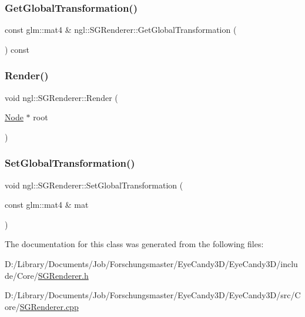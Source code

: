 \mbox{\label{classngl_1_1_s_g_renderer_a7ea21d48ea05c05c4e1cc2161bbaf5d4}} 
\subsubsection{\texorpdfstring{Get\+Global\+Transformation()}{GetGlobalTransformation()}}
{\footnotesize\ttfamily const glm\+::mat4 \& ngl\+::\+S\+G\+Renderer\+::\+Get\+Global\+Transformation (\begin{DoxyParamCaption}{ }\end{DoxyParamCaption}) const}

\mbox{\label{classngl_1_1_s_g_renderer_a608ef64bc93b33694b8650cb05a8a3b1}} 
\subsubsection{\texorpdfstring{Render()}{Render()}}
{\footnotesize\ttfamily void ngl\+::\+S\+G\+Renderer\+::\+Render (\begin{DoxyParamCaption}\item[{\mbox{\hyperlink{classngl_1_1_node}{Node}} $\ast$}]{root }\end{DoxyParamCaption})}

\mbox{\label{classngl_1_1_s_g_renderer_a611a1f8449c50468d4b06a22f2e484e6}} 
\subsubsection{\texorpdfstring{Set\+Global\+Transformation()}{SetGlobalTransformation()}}
{\footnotesize\ttfamily void ngl\+::\+S\+G\+Renderer\+::\+Set\+Global\+Transformation (\begin{DoxyParamCaption}\item[{const glm\+::mat4 \&}]{mat }\end{DoxyParamCaption})}



The documentation for this class was generated from the following files\+:\begin{DoxyCompactItemize}
\item 
D\+:/\+Library/\+Documents/\+Job/\+Forschungsmaster/\+Eye\+Candy3\+D/\+Eye\+Candy3\+D/include/\+Core/\mbox{\hyperlink{_s_g_renderer_8h}{S\+G\+Renderer.\+h}}\item 
D\+:/\+Library/\+Documents/\+Job/\+Forschungsmaster/\+Eye\+Candy3\+D/\+Eye\+Candy3\+D/src/\+Core/\mbox{\hyperlink{_s_g_renderer_8cpp}{S\+G\+Renderer.\+cpp}}\end{DoxyCompactItemize}
